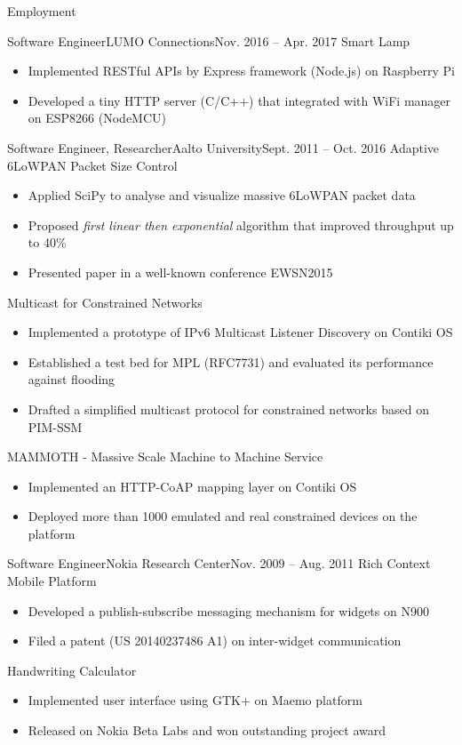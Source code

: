 \documentclass[print]{mcdowellcv}
\begin{document}
\begin{cvsection}{Employment}
		\begin{cvsubsection}{Software Engineer}{LUMO Connections}{Nov. 2016 -- Apr. 2017}	
			Smart Lamp
			\begin{itemize}
				\item Implemented RESTful APIs by Express framework (Node.js) on Raspberry Pi
				\item Developed a tiny HTTP server (C/C++) that integrated with WiFi manager on ESP8266 (NodeMCU)
			\end{itemize}
		\end{cvsubsection}
			
		\begin{cvsubsection}{Software Engineer, Researcher}{Aalto University}{Sept. 2011 -- Oct. 2016}	
			Adaptive 6LoWPAN Packet Size Control
			\begin{itemize}
				\item Applied SciPy to analyse and visualize massive 6LoWPAN packet data
				\item Proposed \textit{first linear then exponential} algorithm that improved throughput up to 40\%
				\item Presented paper in a well-known conference EWSN2015
			\end{itemize}
			\smallskip
			Multicast for Constrained Networks
			\begin{itemize}
				\item Implemented a prototype of IPv6 Multicast Listener Discovery on Contiki OS
				\item Established a test bed for MPL (RFC7731) and evaluated its performance against flooding 
				\item Drafted a simplified multicast protocol for constrained networks based on PIM-SSM
			\end{itemize}
			\smallskip
			MAMMOTH - Massive Scale Machine to Machine Service
			\begin{itemize}
				\item Implemented an HTTP-CoAP mapping layer on Contiki OS
				\item Deployed more than 1000 emulated and real constrained devices on the platform
			\end{itemize}
		\end{cvsubsection}

		\begin{cvsubsection}{Software Engineer}{Nokia Research Center}{Nov. 2009 -- Aug. 2011}	
			Rich Context Mobile Platform
			\begin{itemize}
				\item Developed a publish-subscribe messaging mechanism for widgets on N900
				\item Filed a patent (US 20140237486 A1) on inter-widget communication
			\end{itemize}
			\smallskip
			Handwriting Calculator
			\begin{itemize}
				\item Implemented user interface using GTK+ on Maemo platform
				\item Released on Nokia Beta Labs and won outstanding project award
			\end{itemize}
		\end{cvsubsection}
		

\end{cvsection}
\end{document}
